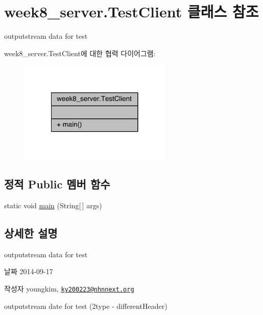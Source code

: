 \hypertarget{classweek8__server_1_1_test_client}{\section{week8\-\_\-server.\-Test\-Client 클래스 참조}
\label{classweek8__server_1_1_test_client}
}


outputstream data for test  




week8\-\_\-server.\-Test\-Client에 대한 협력 다이어그램\-:
\nopagebreak
\begin{figure}[H]
\begin{center}
\leavevmode
\includegraphics[width=206pt]{classweek8__server_1_1_test_client__coll__graph}
\end{center}
\end{figure}
\subsection*{정적 Public 멤버 함수}
\begin{DoxyCompactItemize}
\item 
static void \hyperlink{classweek8__server_1_1_test_client_aacba0a9c55b57e6805aee049047f5d99}{main} (String\mbox{[}$\,$\mbox{]} args)
\end{DoxyCompactItemize}


\subsection{상세한 설명}
outputstream data for test 

\begin{DoxyDate}{날짜}
2014-\/09-\/17 
\end{DoxyDate}
\begin{DoxyAuthor}{작성자}
youngkim, \href{mailto:ky200223@nhnnext.org}{\tt ky200223@nhnnext.\-org}
\end{DoxyAuthor}
outputstream date for test (2type -\/ different\-Header) 

